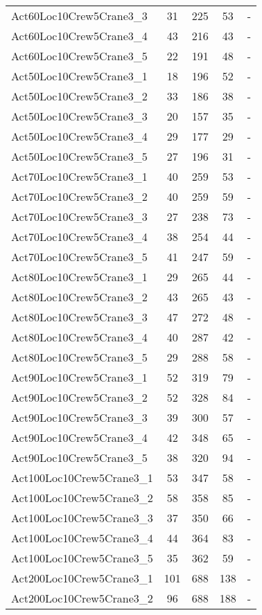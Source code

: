 \begin{center}
\begin{longtable}{ | l | c | c | c | c | }
Act60Loc10Crew5Crane3\_3	&	31	&	225	&	53	& -\\
Act60Loc10Crew5Crane3\_4	&	43	&	216	&	43	& -\\
Act60Loc10Crew5Crane3\_5	&	22	&	191	&	48	& -\\
Act50Loc10Crew5Crane3\_1	&	18	&	196	&	52	& -\\
Act50Loc10Crew5Crane3\_2	&	33	&	186	&	38	& -\\
Act50Loc10Crew5Crane3\_3	&	20	&	157	&	35	& -\\
Act50Loc10Crew5Crane3\_4	&	29	&	177	&	29	& -\\
Act50Loc10Crew5Crane3\_5	&	27	&	196	&	31	& -\\
Act70Loc10Crew5Crane3\_1	&	40	&	259	&	53	& -\\
Act70Loc10Crew5Crane3\_2	&	40	&	259	&	59	& -\\
Act70Loc10Crew5Crane3\_3	&	27	&	238	&	73	& -\\
Act70Loc10Crew5Crane3\_4	&	38	&	254	&	44	& -\\
Act70Loc10Crew5Crane3\_5	&	41	&	247	&	59	& -\\
Act80Loc10Crew5Crane3\_1	&	29	&	265	&	44	& -\\
Act80Loc10Crew5Crane3\_2	&	43	&	265	&	43	& -\\
Act80Loc10Crew5Crane3\_3	&	47	&	272	&	48	& -\\
Act80Loc10Crew5Crane3\_4	&	40	&	287	&	42	& -\\
Act80Loc10Crew5Crane3\_5	&	29	&	288	&	58	& -\\
Act90Loc10Crew5Crane3\_1	&	52	&	319	&	79	& -\\
Act90Loc10Crew5Crane3\_2	&	52	&	328	&	84	& -\\
Act90Loc10Crew5Crane3\_3	&	39	&	300	&	57	& -\\
Act90Loc10Crew5Crane3\_4	&	42	&	348	&	65	& -\\
Act90Loc10Crew5Crane3\_5	&	38	&	320	&	94	& -\\
Act100Loc10Crew5Crane3\_1	&	53	&	347	&	58	& -\\
Act100Loc10Crew5Crane3\_2	&	58	&	358	&	85	& -\\
Act100Loc10Crew5Crane3\_3	&	37	&	350	&	66	& -\\
Act100Loc10Crew5Crane3\_4	&	44	&	364	&	83	& -\\
Act100Loc10Crew5Crane3\_5	&	35	&	362	&	59	& -\\
Act200Loc10Crew5Crane3\_1	&	101	&	688	&	138	& -\\
Act200Loc10Crew5Crane3\_2	&	96	&	688	&	188	& -\\

\end{longtable}
\end{center}
